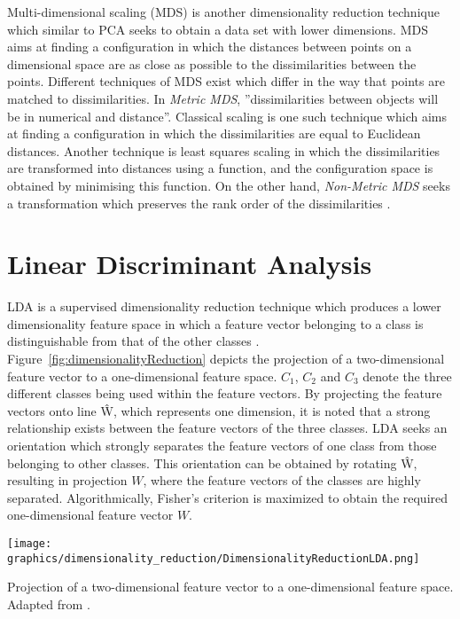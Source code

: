 Multi-dimensional scaling (MDS) is another dimensionality reduction technique which similar to PCA seeks to obtain a data set with lower dimensions. MDS aims at finding a configuration in which the distances between points on a dimensional space are as close as possible to the dissimilarities between the points. Different techniques of MDS exist which differ in the way that points are matched to dissimilarities. In \textit{Metric MDS}, ''dissimilarities between objects will be in numerical and distance''. Classical scaling is one such technique which aims at finding a configuration in which the dissimilarities are equal to Euclidean distances. Another technique is least squares scaling in which the dissimilarities are transformed into distances using a function, and the configuration space is obtained by minimising this function. On the other hand, \textit{Non-Metric MDS} seeks a transformation which preserves the rank order of the dissimilarities \citep{cox2000multidimensional}.

\section{Linear Discriminant Analysis }

LDA is a supervised dimensionality reduction technique which produces a lower dimensionality feature space in which a feature vector belonging to a class is distinguishable from that of the other classes \citep{Sharma2015}. Figure~\ref{fig:dimensionalityReduction} depicts the projection of a two-dimensional feature vector to a one-dimensional feature space. $C_1$, $C_2$ and $C_3$ denote the three different classes being used within the feature vectors. By projecting the feature vectors onto line \^{W}, which represents one dimension, it is noted that a strong relationship exists between the feature vectors of the three classes. LDA seeks an orientation which strongly separates the feature vectors of one class from those belonging to other classes. This orientation can be obtained by rotating \^{W}, resulting in projection $W$, where the feature vectors of the classes are highly separated. Algorithmically, Fisher's criterion is maximized to obtain the required one-dimensional feature vector $W$.

\begin{marginfigure}
	\texttt{[image: graphics/dimensionality\_reduction/DimensionalityReductionLDA.png]}
	\caption{
		Projection of a two-dimensional feature vector to a one-dimensional feature space. Adapted from \citet{Sharma2015}.
	}
	\label{fig:dimensionalityReduction}
  \end{marginfigure}

